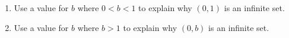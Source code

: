 \begin{previewactivity}
\begin{enumerate}
\begin{enumerate}
\item Use a value for $b$ where $0 < b < 1$ to explain why $( 0, 1 )$ is an infinite set.

\item Use a value for $b$ where $b > 1$ to explain why $( 0, b )$ is an infinite set.
\end{enumerate}

\end{enumerate}
\end{previewactivity}

\endinput


